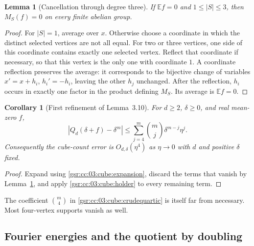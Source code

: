 \documentclass[11pt,letterpaper]{article}
\numberwithin{equation}{section}
\newtheorem{lemma}[theorem]{Lemma}
\newtheorem{corollary}[theorem]{Corollary}
\theoremstyle{definition}
\theoremstyle{remark}
\newcommand{\E}{\mathbb E}
\newcommand{\1}{\mathbf 1}
\begin{document}
\begin{lemma}[Cancellation through degree three]
\label{gsr:cc:03:cube:lowcancel}
If $\E f=0$ and $1\leq|S|\leq3$, then $M_S(f)=0$ on every finite
abelian group.
\end{lemma}

\begin{proof}
For $|S|=1$, average over $x$.  Otherwise choose a coordinate in which
the distinct selected vertices are not all equal.  For two or three
vertices, one side of this coordinate contains exactly one selected
vertex.  Reflect that coordinate if necessary, so that this vertex is
the only one with coordinate $1$.  A coordinate reflection preserves the
average: it corresponds to the bijective change of variables
$x'=x+h_i$, $h_i'=-h_i$, leaving the other $h_j$ unchanged.  After the
reflection, $h_i$ occurs in exactly one factor in the product defining
$M_S$.  Its average is $\E f=0$.
\end{proof}

\begin{corollary}[First refinement of Lemma~3.10]
\label{gsr:cc:03:cube:firstbound}
For $d\geq2$, $\delta\geq0$, and real mean-zero $f$,
\begin{equation}
 \left|Q_d(\delta+f)-\delta^m\right|
 \leq\sum_{j=4}^{m}\binom mj\delta^{m-j}\eta^j.
 \label{gsr:cc:03:cube:crudequartic}
\end{equation}
Consequently the cube-count error is $O_{d,\delta}(\eta^4)$ as
$\eta\to0$ with $d$ and positive $\delta$ fixed.
\end{corollary}

\begin{proof}
Expand using \eqref{gsr:cc:03:cube:expansion}, discard the terms that vanish by
Lemma~\ref{gsr:cc:03:cube:lowcancel}, and apply \eqref{gsr:cc:03:cube:holder} to every
remaining term.
\end{proof}

The coefficient $\binom m4$ in \eqref{gsr:cc:03:cube:crudequartic} is itself far
from necessary.  Most four-vertex supports vanish as well.

\subsection{Fourier energies and the quotient by doubling}
\end{document}
